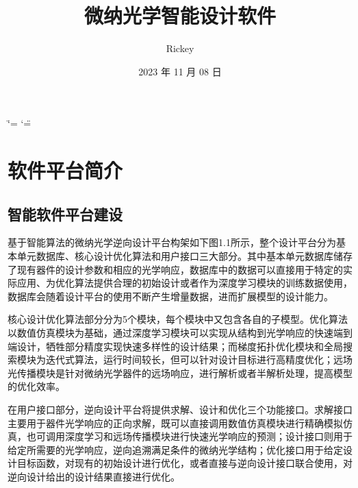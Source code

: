 \documentclass[letterpaper,10pt,english]{sphinxmanual}
\title{微纳光学智能设计软件}
\date{2023 年 11 月 08 日}
\author{Rickey}
\begin{document}
\ifdefined\shorthandoff
  \ifnum\catcode`\=\string=\active\shorthandoff{=}\fi
  \ifnum\catcode`\"=\active{}\fi
\fi

\pagestyle{empty}
\sphinxmaketitle
\pagestyle{plain}
\sphinxtableofcontents
\pagestyle{normal}
\label{\detokenize{index::doc}}


\sphinxstepscope


\chapter{软件平台简介}
\label{\detokenize{_u7b80_u4ecb/index:id1}}\label{\detokenize{_u7b80_u4ecb/index::doc}}
\sphinxstepscope


\section{智能软件平台建设}
\label{\detokenize{_u7b80_u4ecb/_u667a_u80fd_u8f6f_u4ef6_u5e73_u53f0_u5efa_u8bbe/index:id1}}\label{\detokenize{_u7b80_u4ecb/_u667a_u80fd_u8f6f_u4ef6_u5e73_u53f0_u5efa_u8bbe/index::doc}}
\sphinxAtStartPar
基于智能算法的微纳光学逆向设计平台构架如下图1.1所示，整个设计平台分为基本单元数据库、核心设计优化算法和用户接口三大部分。其中基本单元数据库储存了现有器件的设计参数和相应的光学响应，数据库中的数据可以直接用于特定的实际应用、为优化算法提供合理的初始设计或者作为深度学习模块的训练数据使用，数据库会随着设计平台的使用不断产生增量数据，进而扩展模型的设计能力。

\sphinxAtStartPar


\sphinxAtStartPar
{}





\sphinxAtStartPar
核心设计优化算法部分分为5个模块，每个模块中又包含各自的子模型。优化算法以数值仿真模块为基础，通过深度学习模块可以实现从结构到光学响应的快速端到端设计，牺牲部分精度实现快速多样性的设计结果；而梯度拓扑优化模块和全局搜索模块为迭代式算法，运行时间较长，但可以针对设计目标进行高精度优化；远场光传播模块是针对微纳光学器件的远场响应，进行解析或者半解析处理，提高模型的优化效率。

\sphinxAtStartPar
在用户接口部分，逆向设计平台将提供求解、设计和优化三个功能接口。求解接口主要用于器件光学响应的正向求解，既可以直接调用数值仿真模块进行精确模拟仿真，也可调用深度学习和远场传播模块进行快速光学响应的预测；设计接口则用于给定所需要的光学响应，逆向追溯满足条件的微纳光学结构；优化接口用于给定设计目标函数，对现有的初始设计进行优化，或者直接与逆向设计接口联合使用，对逆向设计给出的设计结果直接进行优化。
\end{document}
